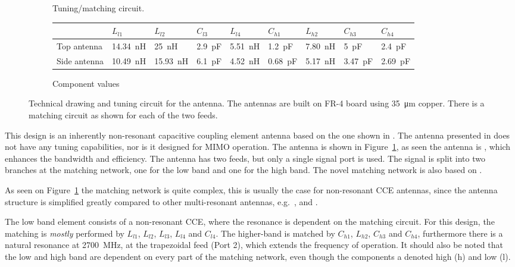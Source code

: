 \begin{figure}[htbp]
\begin{subfigure}[b]{0.49\linewidth}
        \caption{Tuning/matching circuit.}
    \end{subfigure}
    \par\bigskip
        \begin{subfigure}[b]{\linewidth}
        \centering
        \footnotesize
        \begin{tabular}{|l|l|l|l|l|l|l|l|l|}
            \hline
                         & $L_{l1}$       & $L_{l2}$        & $C_{l3}$      & $L_{l4}$       & $C_{h1}$       & $L_{h2}$      & $C_{h3}$      & $C_{h4}$    \\
            \hline
            Top antenna  & \SI{14,34}{nH}  & \SI{25}{nH}  & \SI{2,9}{pF} & \SI{5,51}{nH} & \SI{1,2}{pF} & \SI{7,80}{nH} & \SI{5}{pF} & \SI{2.4}{pF} \\
            Side antenna & \SI{10,49}{nH}  & \SI{15,93}{nH}  & \SI{6.1}{pF} & \SI{4.52}{nH} & \SI{0.68}{pF} & \SI{5.17}{nH} & \SI{3.47}{pF} & \SI{2.69}{pF} \\
            \hline
        \end{tabular}
        \caption{Component values}
    \end{subfigure}
    \caption{Technical drawing and tuning circuit for the antenna.  The antennas are built on FR-4 board using \SI{35}{\micro\meter} copper. There is a matching circuit as shown for each of the two feeds.}
    \label{fig:ant3techschem}
\end{figure}


This design is an inherently non-resonant capacitive coupling element antenna based on the one shown in \cite{valkonen2013inherently}. The antenna presented in \cite{valkonen2013inherently} does not have any tuning capabilities, nor is it designed for MIMO operation. The antenna is shown in Figure~\ref{fig:ant3techschem}, as seen the antenna is , which enhances the bandwidth and efficiency. The antenna has two feeds, but only a single signal port is used. The signal is split into two branches at the matching network, one for the low band and one for the high band. The novel matching network is also based on \cite{valkonen2013inherently}.

As seen on Figure~\ref{fig:ant3techschem} the matching network is quite complex, this is usually the case for non-resonant CCE antennas, since the antenna structure is simplified greatly compared to other multi-resonant antennas, e.g.\ \cite{Tatomirescu2014AT}, \cite{Zhekov2015} and \cite{Zhang2013Diag}.

The low band element consists of a non-resonant CCE, where the resonance is dependent on the matching circuit. For this design, the matching is \emph{mostly} performed by $L_{l1}$, $L_{l2}$, $L_{l3}$, $L_{l4}$ and $C_{l4}$. The higher-band is matched by $C_{h1}$, $L_{h2}$, $C_{h3}$ and $C_{h4}$, furthermore there is a natural resonance at \SI{2700}{MHz}, at the trapezoidal feed (Port 2), which extends the frequency of operation. It should also be noted that the low and high band are dependent on every part of the matching network, even though the components a denoted high (h) and low (l). 
 
